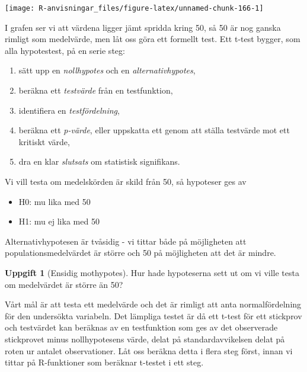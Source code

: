 \documentclass[
]{book}
\newenvironment{Shaded}{\begin{snugshade}}{\end{snugshade}}
\newcommand{\FunctionTok}[1]{\textcolor[rgb]{0.00,0.00,0.00}{#1}}
\newcommand{\NormalTok}[1]{#1}
\newcommand{\SpecialCharTok}[1]{\textcolor[rgb]{0.00,0.00,0.00}{#1}}
\providecommand{\tightlist}{%
  \setlength{\itemsep}{0pt}\setlength{\parskip}{0pt}}
\theoremstyle{definition}
\theoremstyle{definition}
\theoremstyle{definition}
\newtheorem{exercise}{Uppgift}[chapter]
\theoremstyle{definition}
\theoremstyle{remark}
\begin{document}
\begin{center}\texttt{[image: R-anvisningar\_files/figure-latex/unnamed-chunk-166-1]} \end{center}

I grafen ser vi att värdena ligger jämt spridda kring 50, så 50 är nog ganska rimligt som medelvärde, men låt oss göra ett formellt test. Ett t-test bygger, som alla hypotestest, på en serie steg:

\begin{enumerate}
\def\labelenumi{\arabic{enumi}.}
\tightlist
\item
  sätt upp en \emph{nollhypotes} och en \emph{alternativhypotes},
\item
  beräkna ett \emph{testvärde} från en testfunktion,
\item
  identifiera en \emph{testfördelning},
\item
  beräkna ett \emph{p-värde}, eller uppskatta ett genom att ställa testvärde mot ett kritiskt värde,
\item
  dra en klar \emph{slutsats} om statistisk signifikans.
\end{enumerate}

Vi vill testa om medelskörden är skild från 50, så hypoteser ges av

\begin{itemize}
\tightlist
\item
  H0: mu lika med 50
\item
  H1: mu ej lika med 50
\end{itemize}

Alternativhypotesen är tvåsidig - vi tittar både på möjligheten att populationsmedelvärdet är större och 50 på möjligheten att det är mindre.

\begin{exercise}[Ensidig mothypotes]
Hur hade hypoteserna sett ut om vi ville testa om medelvärdet är större än 50?
\end{exercise}

Vårt mål är att testa ett medelvärde och det är rimligt att anta normalfördelning för den undersökta variabeln. Det lämpliga testet är då ett t-test för ett stickprov och testvärdet kan beräknas av en testfunktion som ges av det observerade stickprovet minus nollhypotesens värde, delat på standardavvikelsen delat på roten ur antalet observationer. Låt oss beräkna detta i flera steg först, innan vi tittar på R-funktioner som beräknar t-testet i ett steg.

\begin{Shaded}
\end{Shaded}
\end{document}
